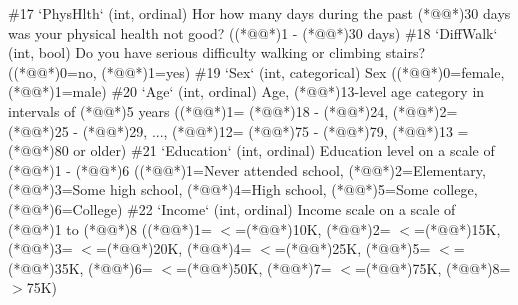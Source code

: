 \documentclass[11pt]{article}
\begin{document}
\begin{codeoutput}
\#17 `PhysHlth` (int, ordinal) Hor how many days during the past (*@@*)30 days was your physical health not good? ((*@@*)1 - (*@@*)30 days)
\#18 `DiffWalk` (int, bool) Do you have serious difficulty walking or climbing stairs? ((*@@*)0=no, (*@@*)1=yes)
\#19 `Sex` (int, categorical) Sex ((*@@*)0=female, (*@@*)1=male)
\#20 `Age` (int, ordinal) Age, (*@@*)13-level age category in intervals of (*@@*)5 years ((*@@*)1= (*@@*)18 - (*@@*)24, (*@@*)2= (*@@*)25 - (*@@*)29, ..., (*@@*)12= (*@@*)75 - (*@@*)79, (*@@*)13 = (*@@*)80 or older)
\#21 `Education` (int, ordinal) Education level on a scale of (*@@*)1 - (*@@*)6 ((*@@*)1=Never attended school, (*@@*)2=Elementary, (*@@*)3=Some high school, (*@@*)4=High school, (*@@*)5=Some college, (*@@*)6=College)
\#22 `Income` (int, ordinal) Income scale on a scale of (*@@*)1 to (*@@*)8 ((*@@*)1= $<$=(*@@*)10K, (*@@*)2= $<$=(*@@*)15K, (*@@*)3= $<$=(*@@*)20K, (*@@*)4= $<$=(*@@*)25K, (*@@*)5= $<$=(*@@*)35K, (*@@*)6= $<$=(*@@*)50K, (*@@*)7= $<$=(*@@*)75K, (*@@*)8= $>$75K)


\end{codeoutput}
\end{document}
